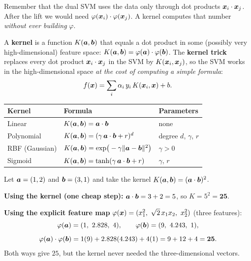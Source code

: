 Remember that the dual SVM uses the data only through dot products $\boldsymbol{x}_i\cdot\boldsymbol{x}_j$. After the lift we would need $\varphi(\boldsymbol{x}_i)\cdot\varphi(\boldsymbol{x}_j)$. A kernel computes that number \emph{without ever building} $\varphi$.

\begin{definition}
A \textbf{kernel} is a function $K(\boldsymbol{a},\boldsymbol{b})$ that equals a dot product in some (possibly very high-dimensional) feature space: $K(\boldsymbol{a},\boldsymbol{b})=\varphi(\boldsymbol{a})\cdot\varphi(\boldsymbol{b})$. The \textbf{kernel trick} replaces every dot product $\boldsymbol{x}_i\cdot\boldsymbol{x}_j$ in the SVM by $K(\boldsymbol{x}_i,\boldsymbol{x}_j)$, so the SVM works in the high-dimensional space \emph{at the cost of computing a simple formula}:
\[
  f(\boldsymbol{x})=\sum_i\alpha_i\,y_i\,K(\boldsymbol{x}_i,\boldsymbol{x})+b .
\]
\end{definition}

\begin{center}
\begin{tabular}{@{}p{3.1cm}p{5.5cm}p{4.9cm}@{}}
\toprule
\textbf{Kernel} & \textbf{Formula} & \textbf{Parameters}\\
\midrule
Linear & $K(\boldsymbol{a},\boldsymbol{b})=\boldsymbol{a}\cdot\boldsymbol{b}$ & none\\
Polynomial & $K(\boldsymbol{a},\boldsymbol{b})=(\gamma\,\boldsymbol{a}\cdot\boldsymbol{b}+r)^{d}$ & degree $d$, $\gamma$, $r$\\
RBF (Gaussian) & $K(\boldsymbol{a},\boldsymbol{b})=\exp\!\big(-\gamma\|\boldsymbol{a}-\boldsymbol{b}\|^2\big)$ & $\gamma>0$\\
Sigmoid & $K(\boldsymbol{a},\boldsymbol{b})=\tanh(\gamma\,\boldsymbol{a}\cdot\boldsymbol{b}+r)$ & $\gamma$, $r$\\
\bottomrule
\end{tabular}
\end{center}

\begin{example}
Let $\boldsymbol{a}=(1,2)$ and $\boldsymbol{b}=(3,1)$ and take the kernel $K(\boldsymbol{a},\boldsymbol{b})=(\boldsymbol{a}\cdot\boldsymbol{b})^2$.

\medskip
\textbf{Using the kernel (one cheap step):} $\boldsymbol{a}\cdot\boldsymbol{b}=3+2=5$, so $K=5^2=\mathbf{25}$.

\medskip
\textbf{Using the explicit feature map} $\varphi(\vect x)=(x_1^2,\ \sqrt2\,x_1x_2,\ x_2^2)$ (three features):
\[
  \varphi(\boldsymbol{a})=(1,\ 2.828,\ 4),\qquad \varphi(\boldsymbol{b})=(9,\ 4.243,\ 1),
\]
\[
  \varphi(\boldsymbol{a})\cdot\varphi(\boldsymbol{b})=1(9)+2.828(4.243)+4(1)=9+12+4=\mathbf{25}.
\]
Both ways give $25$, but the kernel never needed the three-dimensional vectors.
\end{example}


